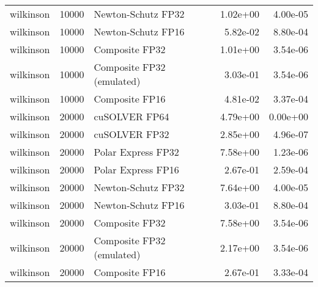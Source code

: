 \begin{table}
\begin{tabular}{lrlrr}
wilkinson & 10000 &        Newton-Schutz FP32 &  1.02e+00 &        4.00e-05 \\
wilkinson & 10000 &        Newton-Schutz FP16 &  5.82e-02 &        8.80e-04 \\
wilkinson & 10000 &            Composite FP32 &  1.01e+00 &        3.54e-06 \\
wilkinson & 10000 & Composite FP32 (emulated) &  3.03e-01 &        3.54e-06 \\
wilkinson & 10000 &            Composite FP16 &  4.81e-02 &        3.37e-04 \\
wilkinson & 20000 &             cuSOLVER FP64 &  4.79e+00 &        0.00e+00 \\
wilkinson & 20000 &             cuSOLVER FP32 &  2.85e+00 &        4.96e-07 \\
wilkinson & 20000 &        Polar Express FP32 &  7.58e+00 &        1.23e-06 \\
wilkinson & 20000 &        Polar Express FP16 &  2.67e-01 &        2.59e-04 \\
wilkinson & 20000 &        Newton-Schutz FP32 &  7.64e+00 &        4.00e-05 \\
wilkinson & 20000 &        Newton-Schutz FP16 &  3.03e-01 &        8.80e-04 \\
wilkinson & 20000 &            Composite FP32 &  7.58e+00 &        3.54e-06 \\
wilkinson & 20000 & Composite FP32 (emulated) &  2.17e+00 &        3.54e-06 \\
wilkinson & 20000 &            Composite FP16 &  2.67e-01 &        3.33e-04 \\
\bottomrule
\end{tabular}
\end{table}
